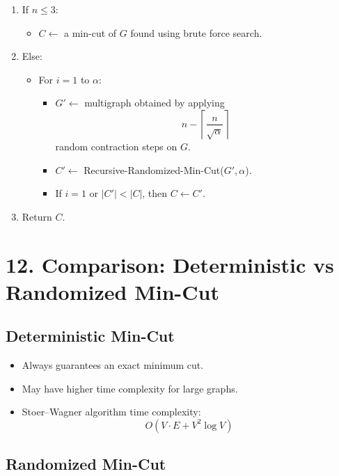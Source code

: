 \documentclass[12pt]{article}
\begin{document}
\begin{enumerate}
    \item If \( n \le 3 \):
    \begin{itemize}
        \item \( C \leftarrow \) a min-cut of \( G \) found using brute force search.
    \end{itemize}
    \item Else:
    \begin{itemize}
        \item For \( i = 1 \) to \( \alpha \):
        \begin{itemize}
            \item \( G' \leftarrow \) multigraph obtained by applying
            \[
            n - \left\lceil \frac{n}{\sqrt{\alpha}} \right\rceil
            \]
            random contraction steps on \( G \).
            \item \( C' \leftarrow \) Recursive-Randomized-Min-Cut(\(G', \alpha\)).
            \item If \( i = 1 \) or \( |C'| < |C| \), then \( C \leftarrow C' \).
        \end{itemize}
    \end{itemize}
    \item Return \( C \).
\end{enumerate}

\section*{12. Comparison: Deterministic vs Randomized Min-Cut}

\subsection*{Deterministic Min-Cut}

\begin{itemize}
    \item Always guarantees an exact minimum cut.
    \item May have higher time complexity for large graphs.
    \item Stoer–Wagner algorithm time complexity:
    \[
    O(V \cdot E + V^2 \log V)
    \]
\end{itemize}

\subsection*{Randomized Min-Cut}
\end{document}
